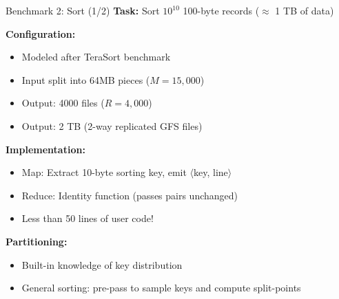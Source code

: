 \documentclass[aspectratio=169]{beamer}
\begin{document}
\begin{frame}{Benchmark 2: Sort (1/2)}
\textbf{Task:} Sort $10^{10}$ 100-byte records ($\approx$ 1 TB of data)

\vspace{0.2cm}

\textbf{Configuration:}
\begin{itemize}
    \item Modeled after TeraSort benchmark
    \item Input split into 64MB pieces ($M = 15,000$)
    \item Output: 4000 files ($R = 4,000$)
    \item Output: 2 TB (2-way replicated GFS files)
\end{itemize}

\vspace{0.2cm}

\textbf{Implementation:}
\begin{itemize}
    \item Map: Extract 10-byte sorting key, emit $\langle$key, line$\rangle$
    \item Reduce: Identity function (passes pairs unchanged)
    \item Less than 50 lines of user code!
\end{itemize}

\vspace{0.2cm}

\textbf{Partitioning:}
\begin{itemize}
    \item Built-in knowledge of key distribution
    \item General sorting: pre-pass to sample keys and compute split-points
\end{itemize}
\end{frame}
\end{document}
